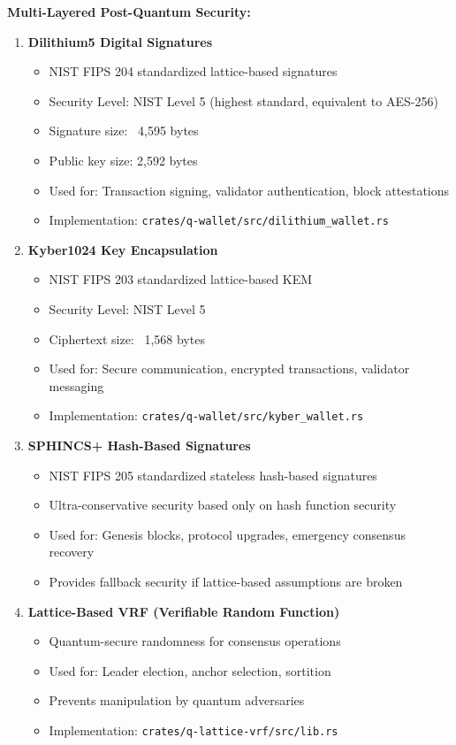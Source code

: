 \documentclass[11pt,a4paper]{scrartcl}
\begin{document}
\textbf{Multi-Layered Post-Quantum Security:}

\begin{enumerate}
\item \textbf{Dilithium5 Digital Signatures}
   \begin{itemize}
   \item NIST FIPS 204 standardized lattice-based signatures
   \item Security Level: NIST Level 5 (highest standard, equivalent to AES-256)
   \item Signature size: ~4,595 bytes
   \item Public key size: 2,592 bytes
   \item Used for: Transaction signing, validator authentication, block attestations
   \item Implementation: \texttt{crates/q-wallet/src/dilithium\_wallet.rs}
   \end{itemize}

\item \textbf{Kyber1024 Key Encapsulation}
   \begin{itemize}
   \item NIST FIPS 203 standardized lattice-based KEM
   \item Security Level: NIST Level 5
   \item Ciphertext size: ~1,568 bytes
   \item Used for: Secure communication, encrypted transactions, validator messaging
   \item Implementation: \texttt{crates/q-wallet/src/kyber\_wallet.rs}
   \end{itemize}

\item \textbf{SPHINCS+ Hash-Based Signatures}
   \begin{itemize}
   \item NIST FIPS 205 standardized stateless hash-based signatures
   \item Ultra-conservative security based only on hash function security
   \item Used for: Genesis blocks, protocol upgrades, emergency consensus recovery
   \item Provides fallback security if lattice-based assumptions are broken
   \end{itemize}

\item \textbf{Lattice-Based VRF (Verifiable Random Function)}
   \begin{itemize}
   \item Quantum-secure randomness for consensus operations
   \item Used for: Leader election, anchor selection, sortition
   \item Prevents manipulation by quantum adversaries
   \item Implementation: \texttt{crates/q-lattice-vrf/src/lib.rs}
   \end{itemize}
\end{enumerate}
\end{document}
